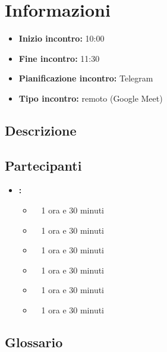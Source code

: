 \section{Informazioni}
\begin{itemize}
	\item \textbf{Inizio incontro:} 10:00
	\item \textbf{Fine incontro:} 11:30
	\item \textbf{Pianificazione incontro:} Telegram
	\item \textbf{Tipo incontro:} remoto (Google Meet)
\end{itemize}

\subsection{Descrizione}
\DocDescription

\subsection{Partecipanti}

\begin{itemize}
	\item \textbf{\GroupName:}
	\begin{itemize}
		\item \tommaso \ \rightarrow\ 1 ora e 30 minuti
		\item \marco \ \rightarrow\ 1 ora e 30 minuti
		\item \riccardo \ \rightarrow\ 1 ora e 30 minuti
		\item \raul \ \rightarrow\ 1 ora e 30 minuti
		\item \martina \ \rightarrow\ 1 ora e 30 minuti
		\item \sebastiano \ \rightarrow\ 1 ora e 30 minuti
	\end{itemize}
\end{itemize}

\subsection{Glossario}
\GlossarioIntroduzione

\clearpage